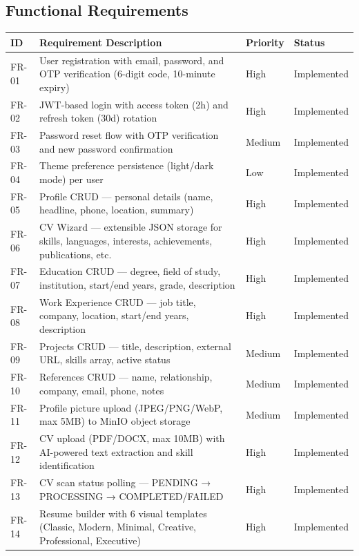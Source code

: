 \documentclass[12pt,a4paper]{report}
\begin{document}
\subsection{Functional Requirements}

\begin{longtable}{|p{0.8cm}|p{6cm}|p{3cm}|p{3cm}|}
\hline
\textbf{ID} & \textbf{Requirement Description} & \textbf{Priority} & \textbf{Status} \\
\hline
FR-01 & User registration with email, password, and OTP verification (6-digit code, 10-minute expiry) & High & Implemented \\
\hline
FR-02 & JWT-based login with access token (2h) and refresh token (30d) rotation & High & Implemented \\
\hline
FR-03 & Password reset flow with OTP verification and new password confirmation & Medium & Implemented \\
\hline
FR-04 & Theme preference persistence (light/dark mode) per user & Low & Implemented \\
\hline
FR-05 & Profile CRUD — personal details (name, headline, phone, location, summary) & High & Implemented \\
\hline
FR-06 & CV Wizard — extensible JSON storage for skills, languages, interests, achievements, publications, etc. & High & Implemented \\
\hline
FR-07 & Education CRUD — degree, field of study, institution, start/end years, grade, description & High & Implemented \\
\hline
FR-08 & Work Experience CRUD — job title, company, location, start/end years, description & High & Implemented \\
\hline
FR-09 & Projects CRUD — title, description, external URL, skills array, active status & Medium & Implemented \\
\hline
FR-10 & References CRUD — name, relationship, company, email, phone, notes & Medium & Implemented \\
\hline
FR-11 & Profile picture upload (JPEG/PNG/WebP, max 5MB) to MinIO object storage & Medium & Implemented \\
\hline
FR-12 & CV upload (PDF/DOCX, max 10MB) with AI-powered text extraction and skill identification & High & Implemented \\
\hline
FR-13 & CV scan status polling — PENDING → PROCESSING → COMPLETED/FAILED & High & Implemented \\
\hline
FR-14 & Resume builder with 6 visual templates (Classic, Modern, Minimal, Creative, Professional, Executive) & High & Implemented \\

\end{longtable}
\end{document}
